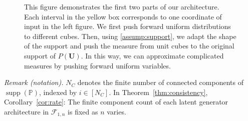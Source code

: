 \begin{figure}[!tb]
\begin{minipage}[t]{0.49\textwidth}
{
}
\caption{ This figure demonstrates the first two parts of our architecture. Each interval in the yellow box corresponds to one coordinate of input in the left figure. We first push forward uniform distributions to different cubes. Then, using \cref{assump:support}, we adapt the shape of the support and push the measure from unit cubes to the original support of $P(\boldsymbol{U})$. In this way, we can approximate complicated measures by pushing forward uniform variables. }
\label{fig:pf-2}
\end{minipage}
\end{figure}

\noindent\textit{Remark (notation).} $N_C$ denotes the finite number of connected components of $\operatorname{supp}(\mathbb P)$, indexed by $i\in[N_C]$. In Theorem~\ref{thm:consistency}, Corollary~\ref{cor:rate}: The finite component count of each latent generator architecture in $\mathcal F_{1,n}$ is fixed as $n$ varies.



